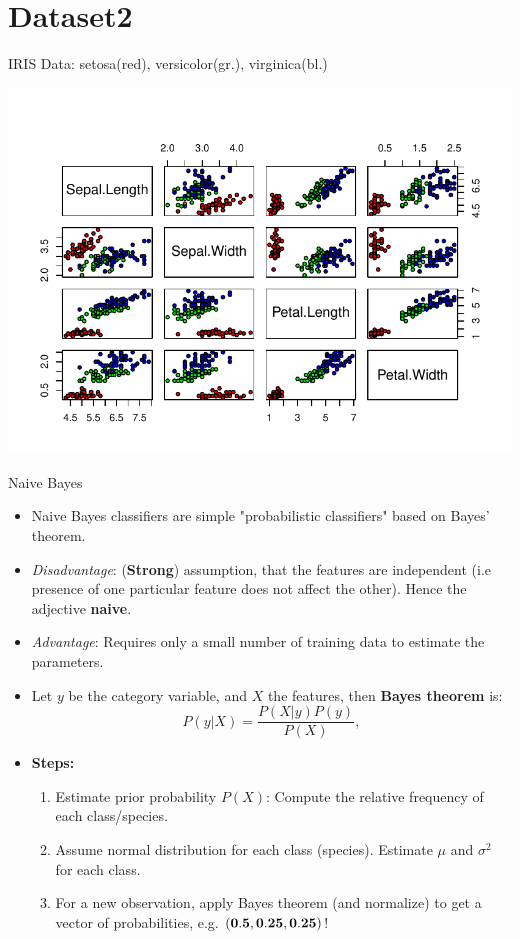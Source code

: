 \documentclass[aspectratio=1610, t]{beamer}\usepackage[]{graphicx}\usepackage[]{color}
\makeatletter
\def\maxwidth{ %
  \ifdim\Gin@nat@width>\linewidth
    \linewidth
  \else
    \Gin@nat@width
  \fi
}
\newenvironment{knitrout}{}{} %
\makeatother
\begin{document}
\section{Dataset2}
\begin{frame}{IRIS Data: \small setosa(red), versicolor(gr.), virginica(bl.)}
\vspace{-1.9cm}
\begin{knitrout}
\color{fgcolor}

{\centering \includegraphics[width=\maxwidth]{figure/scatterplot-1} 

}


\end{knitrout}
\end{frame}

\begin{frame}{Naive Bayes}
\begin{itemize}
\item Naive Bayes classifiers are simple "probabilistic classifiers" based on Bayes' theorem.
\item \textit{Disadvantage}: (\textbf{Strong}) assumption, that the features are independent (i.e presence of one particular feature does not affect the other). Hence the adjective \textbf{naive}.
\item \textit{Advantage}: Requires only a small number of training data to estimate the parameters.
\item Let $y$ be the category variable, and $X$ the features, then \textcolor{wublue}{\textbf{Bayes theorem}} is:
$$P(y|X) = \frac{P(X|y)P(y)}{P(X)},$$

\item \textcolor{wublue}{\textbf{Steps:}}
\begin{enumerate}\small
  \item Estimate prior probability $P(X)$: Compute the relative frequency of each class/species.
  \item Assume normal distribution for each class (species). Estimate $\mu$ and $\sigma^2$ for each class.
  \item For a new observation, apply Bayes theorem (and normalize) to get a vector of probabilities, e.g. $(\bf{0.5},0.25,0.25)$!
\end{enumerate}
\end{itemize}
\end{frame}
\end{document}
